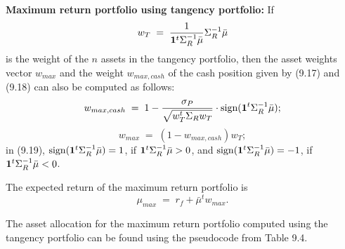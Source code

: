 
\noindent\textbf{Maximum return portfolio using tangency portfolio:} If
\[
w_T \;=\; \frac{1}{\mathbf{1}^t\Sigma_R^{-1}\bar\mu}\Sigma_R^{-1}\bar\mu
\]
is the weight of the $n$ assets in the tangency portfolio, then the asset weights
vector $w_{max}$ and the weight $w_{max,cash}$ of the cash position given by (9.17) and
(9.18) can also be computed as follows:
\begin{equation}
w_{max,cash} \;=\; 1 - \frac{\sigma_P}{\sqrt{w_T^t\Sigma_Rw_T}}\cdot
\text{sign}(\mathbf{1}^t\Sigma_R^{-1}\bar\mu);
\end{equation}
\begin{equation}
w_{max} \;=\; (1-w_{max,cash})w_T;
\end{equation}
in (9.19), $\text{sign}(\mathbf{1}^t\Sigma_R^{-1}\bar\mu) = 1$, if
$\mathbf{1}^t\Sigma_R^{-1}\bar\mu > 0$, and
$\text{sign}(\mathbf{1}^t\Sigma_R^{-1}\bar\mu) = -1$, if
$\mathbf{1}^t\Sigma_R^{-1}\bar\mu < 0$.

The expected return of the maximum return portfolio is
\[
\mu_{max} \;=\; r_f+\bar\mu^tw_{max}.
\]

The asset allocation for the maximum return portfolio computed using the tangency
portfolio can be found using the pseudocode from Table 9.4.

